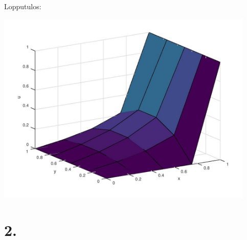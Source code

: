 \documentclass{article}
\begin{document}
Lopputulos:

\includegraphics[width=350pt]{w4_1.jpg}

\newpage

\section*{2.}
\end{document}
